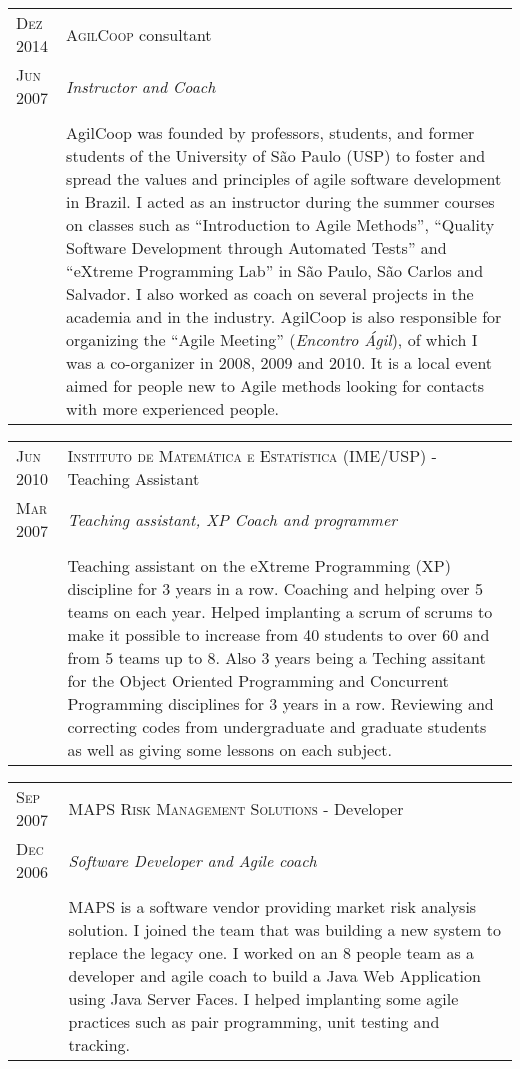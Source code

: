 \documentclass[letter,10pt]{article}
\begin{document}
\begin{tabular}{p{2.5cm}|p{13.5cm}}
  \textsc{Dez 2014} & \textsc{AgilCoop} consultant\\
  \textsc{Jun 2007}& \emph{Instructor and Coach}\\
  &\\
  &AgilCoop was founded by professors,
  students, and former students of the University of São Paulo (USP)
  to foster and spread the values and principles of agile software
  development in Brazil. I acted as an instructor during the summer
  courses on classes such as ``Introduction to Agile Methods'',
  ``Quality Software Development through Automated Tests'' and
  ``eXtreme Programming Lab'' in São Paulo, São Carlos and Salvador.
  I also worked as coach on several projects in the academia
  and in the industry. AgilCoop is also responsible for organizing
  the ``Agile Meeting'' (\emph{Encontro Ágil}), of which I was a
  co-organizer in 2008, 2009 and 2010. It is a local
  event aimed for people new to Agile methods looking for contacts
  with more experienced people.
\end{tabular}

\begin{tabular}{p{2.5cm}|p{13.5cm}}
  \textsc{Jun 2010} & \textsc{Instituto de Matemática e Estatística
    (IME/USP)} - Teaching Assistant\\
  \textsc{Mar 2007}& \emph{Teaching assistant, XP Coach and programmer}\\
  &\\
  & Teaching assistant on the eXtreme Programming (XP) discipline for
  3 years in a row. Coaching and helping over 5 teams on each
  year. Helped implanting a scrum of scrums to make it possible to
  increase from 40 students to over 60 and from 5 teams up to 8.
  Also 3 years being a Teching assitant for the Object Oriented
  Programming and Concurrent Programming disciplines for 3 years in a
  row. Reviewing and correcting codes from undergraduate and graduate
  students as well as giving some lessons on each subject.
\end{tabular}

\begin{tabular}{p{2.5cm}|p{13.5cm}}
  \textsc{Sep 2007} & \textsc{MAPS Risk
    Management Solutions} - Developer\\
  \textsc{Dec 2006} &\emph{Software Developer and Agile coach}\\
  &\\
  & MAPS is a software vendor providing market risk
  analysis solution. I joined the team that was building a new
  system to replace the legacy one. I worked on an 8 people team as a
  developer and agile coach to build a Java Web Application using
  Java Server Faces. I helped implanting some agile practices such as pair programming, unit
  testing and tracking.
\end{tabular}
\end{document}

